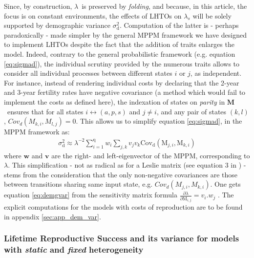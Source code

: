 \documentclass[10pt,a4paper]{article}
\newcommand{\M}{$\mathbf{M}$}
\newcommand{\lam}{$\lambda$}
\begin{document}
Since, by construction, \lam\ is preserved by \emph{folding}, and because, in this article, the focus is on constant environments, the effects of LHTOs on $\lambda_{s}$ will be solely supported by demographic variance $\sigma_\mathrm{d}^2$.
Computation of the latter is - perhaps paradoxically - made simpler by the general MPPM framework we have designed to implement LHTOs despite the fact that the addition of traits enlarges the model. Indeed, contrary to the general probabilistic framework (e.g. equation \ref{eq:sigmad}), the individual scrutiny provided by the numerous traits allows to consider all individual processes between different states $i$ or $j$, as independent.  For instance, instead of rendering individual costs by declaring that the 2-year and 3-year fertility rates have negative covariance (a method which would  fail to implement the costs as defined here), the indexation of states on \emph{parity} in \M\ ensures that for all states $i\leftrightarrow (a,p,s)$ and $j \neq i$, and any pair of states $(k,l)$, $Cov_{d}(M_{k,i},M_{l,j})=0 $. This allows us to simplify equation \ref{eq:sigmad}, in the MPPM framework %
as:
\begin{eqnarray}
\sigma_\mathrm{d}^2 \approx \lambda^{-2} \sum_{i=1}^{\mathrm{q}} w_i \sum_{j,k} v_{j}v_{k}\mathrm{Cov_d}(\mathrm{M}_{j,i},\mathrm{M}_{k,i}) 
\label{eq:demgvar}
\end{eqnarray}
where $\bm{w}$ and $\bm{v}$ are the right- and left-eigenvector of the MPPM, corresponding to \lam. This simplification  - not as radical as for a Leslie matrix (see equation 3 in \citep{Engen2005}) - stems from the consideration that the only non-negative covariances are those between transitions sharing same input state, e.g. $Cov_{d}(M_{j,i},M_{k,i})$. One gets  equation \ref{eq:demgvar} from the sensitivity matrix formula $\frac{\partial \lambda}{\partial \mathrm{M}_{i,j}}=v_{i}.w_{j}$ \citep{Caswell1978}. The explicit computations for the models with costs of reproduction are to be found in appendix  \ref{sec:app_dem_var}.



\subsubsection{Lifetime Reproductive Success and its variance for models with \emph{static} and \emph{fixed} heterogeneity}
\end{document}

